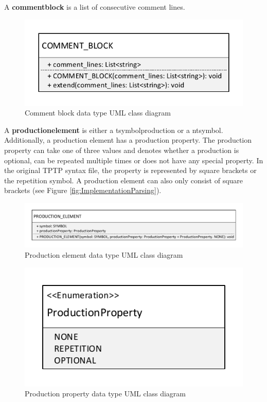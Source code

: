 A \textbf{comment\textunderscore block} is a list of consecutive comment lines. 

\begin{figure}[H]
\centering
\includegraphics[width=.5\textwidth]{images/Concept_uml_data_types_comment_block.pdf}
\caption{Comment block data type UML class diagram}
\label{fig:ConceptCommentBlockClassDiagram}
\end{figure}


A \textbf{production\textunderscore element} is either a t\textunderscore symbol\textunderscore production or a nt\textunderscore symbol. Additionally, a production element has a production property.
The production property can take one of three values and denotes whether a production is optional, can be repeated multiple times or does not have any special property.
In the original TPTP syntax file, the property is represented by square brackets or the repetition symbol. A production element can also only consist of square brackets (see Figure \ref{fig:ImplementationParsing}).

\begin{figure}[H]
\centering
\includegraphics[width=.8\textwidth]{images/Concept_uml_data_types_production_element.pdf}
\caption{Production element data type UML class diagram}
\label{fig:ConceptProductionElementClassDiagram}
\end{figure}

\begin{figure}[H]
\centering
\includegraphics[width=.4\textwidth]{images/Concept_uml_data_types_production_property.pdf}
\caption{Production property data type UML class diagram}
\label{fig:ConceptProductionPropertyClassDiagram}
\end{figure}

